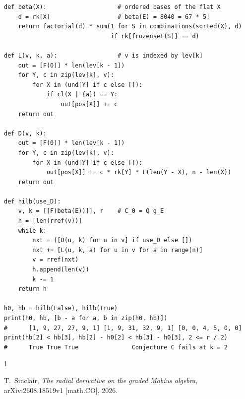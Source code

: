 \documentclass[11pt]{amsart}
\theoremstyle{remark}
\begin{document}
{\begin{verbatim}
def beta(X):                    # ordered bases of the flat X
    d = rk[X]                   # beta(E) = 8040 = 67 * 5!
    return factorial(d) * sum(1 for S in combinations(sorted(X), d)
                              if rk[frozenset(S)] == d)

def L(v, k, a):                 # v is indexed by lev[k]
    out = [F(0)] * len(lev[k - 1])
    for Y, c in zip(lev[k], v):
        for X in (und[Y] if c else []):
            if cl(X | {a}) == Y:
                out[pos[X]] += c
    return out

def D(v, k):
    out = [F(0)] * len(lev[k - 1])
    for Y, c in zip(lev[k], v):
        for X in (und[Y] if c else []):
            out[pos[X]] += c * rk[Y] * F(len(Y - X), n - len(X))
    return out

def hilb(use_D):
    v, k = [[F(beta(E))]], r    # C_0 = Q g_E
    h = [len(rref(v))]
    while k:
        nxt = ([D(u, k) for u in v] if use_D else [])
        nxt += [L(u, k, a) for u in v for a in range(n)]
        v = rref(nxt)
        h.append(len(v))
        k -= 1
    return h

h0, hb = hilb(False), hilb(True)
print(h0, hb, [b - a for a, b in zip(h0, hb)])
#      [1, 9, 27, 27, 9, 1] [1, 9, 31, 32, 9, 1] [0, 0, 4, 5, 0, 0]
print(hb[2] < hb[3], hb[2] - h0[2] < hb[3] - h0[3], 2 <= r / 2)
#      True True True               Conjecture C fails at k = 2
\end{verbatim}
}

\begin{thebibliography}{1}

T.~Sinclair,
\emph{The radial derivative on the graded M\"obius algebra},
arXiv:2608.18519v1 [math.CO], 2026.

\end{thebibliography}
\end{document}
